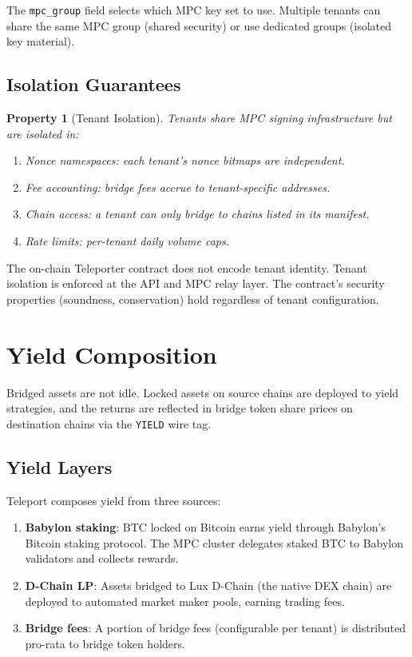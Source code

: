 \documentclass[11pt]{article}
\newtheorem{property}{Property}
\begin{document}
The \texttt{mpc\_group} field selects which MPC key set to use. Multiple tenants can share the same MPC group (shared security) or use dedicated groups (isolated key material).

\subsection{Isolation Guarantees}

\begin{property}[Tenant Isolation]
Tenants share MPC signing infrastructure but are isolated in:
\begin{enumerate}[nosep]
  \item Nonce namespaces: each tenant's nonce bitmaps are independent.
  \item Fee accounting: bridge fees accrue to tenant-specific addresses.
  \item Chain access: a tenant can only bridge to chains listed in its manifest.
  \item Rate limits: per-tenant daily volume caps.
\end{enumerate}
\end{property}

The on-chain Teleporter contract does not encode tenant identity. Tenant isolation is enforced at the API and MPC relay layer. The contract's security properties (soundness, conservation) hold regardless of tenant configuration.

\section{Yield Composition}
\label{sec:yield}

Bridged assets are not idle. Locked assets on source chains are deployed to yield strategies, and the returns are reflected in bridge token share prices on destination chains via the \texttt{YIELD} wire tag.

\subsection{Yield Layers}

Teleport composes yield from three sources:

\begin{enumerate}[nosep]
  \item \textbf{Babylon staking}: BTC locked on Bitcoin earns yield through Babylon's Bitcoin staking protocol. The MPC cluster delegates staked BTC to Babylon validators and collects rewards.
  \item \textbf{D-Chain LP}: Assets bridged to Lux D-Chain (the native DEX chain) are deployed to automated market maker pools, earning trading fees.
  \item \textbf{Bridge fees}: A portion of bridge fees (configurable per tenant) is distributed pro-rata to bridge token holders.
\end{enumerate}
\end{document}
